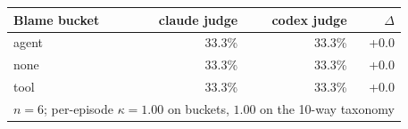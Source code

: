 \begin{tabular}{lrrr}
\toprule
\textbf{Blame bucket} & \textbf{claude judge} & \textbf{codex judge} & \textbf{$\Delta$} \\
\midrule
agent & 33.3\% & 33.3\% & +0.0 \\
none & 33.3\% & 33.3\% & +0.0 \\
tool & 33.3\% & 33.3\% & +0.0 \\
\midrule
\multicolumn{4}{l}{\small $n=6$; per-episode $\kappa=1.00$ on buckets, $1.00$ on the 10-way taxonomy} \\
\bottomrule
\end{tabular}